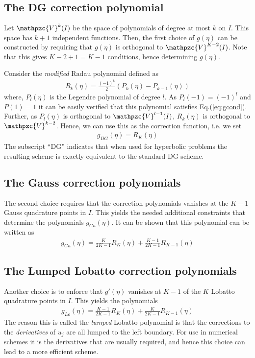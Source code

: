 \documentclass[11pt, reqno]{amsart}
\newcommand{\eqr}[1]{Eq.\thinspace(#1)}
\newcommand{\script}[1]{\mathpzc{#1}}
\theoremstyle{definition}
\begin{document}
\subsection{The DG correction polynomial}

Let $\script{V}^k(I)$ be the space of polynomials of degree at most
$k$ on $I$. This space has $k+1$ independent functions. Then, the
first choice of $g(\eta)$ can be constructed by requiring that
$g(\eta)$ is orthogonal to $\script{V}^{K-2}(I)$. Note that this gives
$K-2+1 = K-1$ conditions, hence determining $g(\eta)$. 

Consider the \emph{modified} Radau polynomial defined as
\begin{align}
  R_k(\eta) = \frac{(-1)^k}{2}
  \left( 
    P_k(\eta) - P_{k-1}(\eta)
  \right)
\end{align}
where, $P_l(\eta)$ is the Legendre polynomial of degree $l$. As
$P_l(-1) = (-1)^l$ and $P(1) = 1$ it can be easily verified that this
polynomial satisfies \eqr{\ref{eq:gcond}}. Further, as $P_l(\eta)$ is
orthogonal to $\script{V}^{l-1}(I)$, $R_k(\eta)$ is orthogonal to
$\script{V}^{k-2}$. Hence, we can use this as the correction function,
i.e. we set
\begin{align}
  \boxed{
  g_{DG}(\eta) = R_K(\eta)
}
\end{align}
The subscript ``DG'' indicates that when used for hyperbolic problems
the resulting scheme is exactly equivalent to the standard DG scheme.

\subsection{The Gauss correction polynomials}

The second choice requires that the correction polynomials vanishes at
the $K-1$ Gauss quadrature points in $I$. This yields the needed
additional constraints that determine the polynomials
$g_{Ga}(\eta)$. It can be shown that this polynomial can be written as
\begin{align}
  \boxed{
  g_{Ga}(\eta) = 
  \frac{K}{2K-1}R_K(\eta) 
  +
  \frac{K-1}{2K-1}R_{K-1}(\eta)
}
\end{align}

\subsection{The Lumped Lobatto correction polynomials}

Another choice is to enforce that $g'(\eta)$ vanishes at $K-1$ of the
$K$ Lobatto quadrature points in $I$. This yields the polynomials
\begin{align}
  \boxed{
  g_{Lo}(\eta) = 
  \frac{K-1}{2K-1}R_K(\eta) 
  +
  \frac{K}{2K-1}R_{K-1}(\eta)
}
\end{align}
The reason this is called the \emph{lumped} Lobatto polynomial is that
the corrections to the \emph{derivatives} of $u_j$ are all lumped to
the left boundary. For use in numerical schemes it is the derivatives
that are usually required, and hence this choice can lead to a more
efficient scheme.
\end{document}
